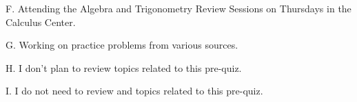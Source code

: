 \documentclass{ximera}
\begin{document}
\begin{question}
\begin{question}
    \begin{multipleChoice}
    \end{multipleChoice}
    
\end{question}
\begin{question}
    
    F. Attending the Algebra and Trigonometry Review Sessions on Thursdays in the Calculus Center.

    \begin{multipleChoice}
    \end{multipleChoice}
    
\end{question}
\begin{question}
    
    G. Working on practice problems from various sources.

    \begin{multipleChoice}
    \end{multipleChoice}
    
\end{question}
\begin{question}
    
    H. I don't plan to review topics related to this pre-quiz.

    \begin{multipleChoice}
    \end{multipleChoice}
    
\end{question}
\begin{question}
    
    I. I do not need to review and topics related to this pre-quiz.

    \begin{multipleChoice}
    \end{multipleChoice}

\end{question}
\end{question}
\end{document}
